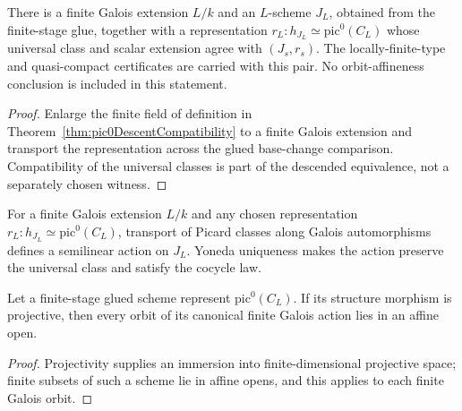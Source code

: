 \begin{theorem}
  \label{thm:pic0FiniteGaloisStage}
  \notready
  There is a finite Galois extension \(L/k\) and an \(L\)-scheme \(J_L\), obtained from the
  finite-stage glue, together with a representation
  \(r_L:h_{J_L}\simeq\mathrm{pic}^0(C_L)\) whose universal class and scalar extension agree
  with \((J_s,r_s)\).  The locally-finite-type and quasi-compact certificates are carried with
  this pair.  No orbit-affineness conclusion is included in this statement.
\end{theorem}
\begin{proof}
  Enlarge the finite field of definition in
  Theorem~\ref{thm:pic0DescentCompatibility} to a finite Galois extension and transport the
  representation across the glued base-change comparison.  Compatibility of the universal
  classes is part of the descended equivalence, not a separately chosen witness.
\end{proof}

\begin{definition}
  \label{def:pic0FiniteGaloisAction}
  \leanok
  For a finite Galois extension \(L/k\) and any chosen representation
  \(r_L:h_{J_L}\simeq\mathrm{pic}^0(C_L)\), transport of Picard classes along Galois
  automorphisms defines a semilinear action on \(J_L\).  Yoneda uniqueness makes the action
  preserve the universal class and satisfy the cocycle law.
\end{definition}

\begin{theorem}
  \label{thm:pic0FiniteStage_orbitsInAffine_of_projective}
  \leanok
  Let a finite-stage glued scheme represent \(\mathrm{pic}^0(C_L)\).  If its structure
  morphism is projective, then every orbit of its canonical finite Galois action lies in an
  affine open.
\end{theorem}
\begin{proof}
  \leanok
  Projectivity supplies an immersion into finite-dimensional projective space; finite subsets
  of such a scheme lie in affine opens, and this applies to each finite Galois orbit.
\end{proof}

